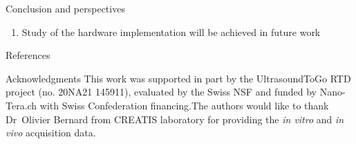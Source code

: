 {\begin{block}{Conclusion and perspectives}
\begin{enumerate}
		\item Study of the hardware implementation will be achieved in future work
	\end{enumerate}
\end{block}
\vfill
\begin{block}{References}
	\printbibliography
\end{block}
\vfill
\begin{block}{Acknowledgments}
	This work was supported in part by the UltrasoundToGo RTD project (no. 20NA21 145911), evaluated by the Swiss NSF and funded by Nano-Tera.ch with Swiss Confederation financing.The authors would like to thank Dr~Olivier Bernard from CREATIS laboratory for providing the \textit{in vitro} and \textit{in vivo} acquisition data.
\end{block}
}%